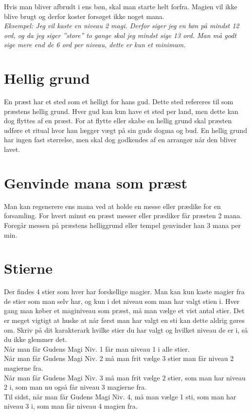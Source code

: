 Hvis man bliver afbrudt i ens bøn, skal man starte helt forfra. Magien vil ikke blive brugt og derfor koster forsøget ikke noget mana.\\
\textit{Eksempel: Jeg vil kaste en niveau 2 magi. Derfor siger jeg en bøn på mindst 12 ord, og da jeg siger ”store” to gange skal jeg mindst sige 13 ord. Man må godt sige mere end de 6 ord per niveau, dette er kun et minimum.}

\section*{Hellig grund}
En præst har et sted som et helligt for hans gud. Dette sted refereres til som præstens hellig grund. Hver gud kan kun have et sted per land, men dette kan dog flyttes af en præst. For at flytte eller skabe en hellig grund skal præsten udføre et ritual hvor han lægger vægt på sin guds dogma og bud. En hellig grund har ingen fast størrelse, men skal dog godkendes af en arrangør når den bliver lavet.

\section*{Genvinde mana som præst}
Man kan regenerere ens mana ved at holde en messe eller prædike for en forsamling. For hvert minut en præst messer eller prædiker får præsten 2 mana. Foregår messen på præstens helliggrund eller tempel genvinder han 3 mana per min.

\section*{Stierne}
Der findes 4 stier som hver har forskellige magier. Man kan kun kaste magier fra de stier som man selv har, og kun i det niveau som man har valgt stien i. Hver gang man køber et maginiveau som præst, må man vælge et vist antal stier. Det er meget vigtigt at huske at når først man har valgt en sti kan dette aldrig gøres om. Skriv på dit karakterark hvilke stier du har valgt og hvilket niveau de er i, så du ikke glemmer det.\\
Når man får Gudens Magi Niv. 1 får man niveau 1 i alle stier. \\
Når man får Gudens Magi Niv. 2 må man frit vælge 3 stier man får niveau 2 magierne fra.\\ 
Når man får Gudens Magi Niv. 3 må man frit vælge 2 stier, som man har niveau 2 i, som man nu også får niveau 3 magierne fra.\\ 
Til sidst, når man får Gudens Magi Niv. 4, må man vælge 1 sti, som man har niveau 3 i, som man får niveau 4 magien fra.







